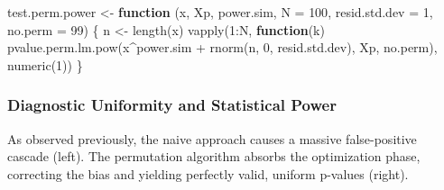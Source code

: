 \documentclass[
  letterpaper,
  DIV=11,
  numbers=noendperiod]{scrreprt}
\newenvironment{Shaded}{\begin{snugshade}}{\end{snugshade}}
\newcommand{\AttributeTok}[1]{\textcolor[rgb]{0.40,0.45,0.13}{#1}}
\newcommand{\ControlFlowTok}[1]{\textcolor[rgb]{0.00,0.23,0.31}{\textbf{#1}}}
\newcommand{\DecValTok}[1]{\textcolor[rgb]{0.68,0.00,0.00}{#1}}
\newcommand{\FunctionTok}[1]{\textcolor[rgb]{0.28,0.35,0.67}{#1}}
\newcommand{\NormalTok}[1]{\textcolor[rgb]{0.00,0.23,0.31}{#1}}
\newcommand{\OtherTok}[1]{\textcolor[rgb]{0.00,0.23,0.31}{#1}}
\newcommand{\SpecialCharTok}[1]{\textcolor[rgb]{0.37,0.37,0.37}{#1}}
\begin{document}
\begin{Shaded}
\begin{Highlighting}[]
\NormalTok{test.perm.power }\OtherTok{\textless{}{-}} \ControlFlowTok{function}\NormalTok{ (x, Xp, power.sim, }\AttributeTok{N =} \DecValTok{100}\NormalTok{, }\AttributeTok{resid.std.dev =} \DecValTok{1}\NormalTok{, }\AttributeTok{no.perm =} \DecValTok{99}\NormalTok{)}
\NormalTok{\{}
\NormalTok{    n }\OtherTok{\textless{}{-}} \FunctionTok{length}\NormalTok{(x)}
    \FunctionTok{vapply}\NormalTok{(}\DecValTok{1}\SpecialCharTok{:}\NormalTok{N,}
           \ControlFlowTok{function}\NormalTok{(k) }\FunctionTok{pvalue.perm.lm.pow}\NormalTok{(x}\SpecialCharTok{\^{}}\NormalTok{power.sim }\SpecialCharTok{+} \FunctionTok{rnorm}\NormalTok{(n, }\DecValTok{0}\NormalTok{, resid.std.dev),}
\NormalTok{                                          Xp, no.perm),}
           \FunctionTok{numeric}\NormalTok{(}\DecValTok{1}\NormalTok{))}
\NormalTok{\}}
\end{Highlighting}
\end{Shaded}

\subsubsection{Diagnostic Uniformity and Statistical
Power}\label{diagnostic-uniformity-and-statistical-power}

As observed previously, the naive approach causes a massive
false-positive cascade (left). The permutation algorithm absorbs the
optimization phase, correcting the bias and yielding perfectly valid,
uniform p-values (right).
\end{document}
